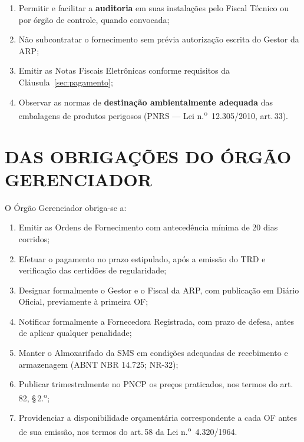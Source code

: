 \documentclass[12pt,a4paper]{article}
\newcommand{\art}[1]{art.\,#1}
\begin{document}
\begin{enumerate}
  \item Permitir e facilitar a \textbf{auditoria} em suas instalações pelo
    Fiscal Técnico ou por órgão de controle, quando convocada;

  \item Não subcontratar o fornecimento sem prévia autorização escrita do
    Gestor da ARP;

  \item Emitir as Notas Fiscais Eletrônicas conforme requisitos da
    Cláusula~\ref{sec:pagamento};

  \item Observar as normas de \textbf{destinação ambientalmente adequada}
    das embalagens de produtos perigosos (PNRS --- Lei
    n.\textsuperscript{o}~12.305/2010, \art{33}).
\end{enumerate}

\section{DAS OBRIGAÇÕES DO ÓRGÃO GERENCIADOR}

O Órgão Gerenciador obriga-se a:

\begin{enumerate}
  \item Emitir as Ordens de Fornecimento com antecedência mínima de 20 dias
    corridos;

  \item Efetuar o pagamento no prazo estipulado, após a emissão do TRD e
    verificação das certidões de regularidade;

  \item Designar formalmente o Gestor e o Fiscal da ARP, com publicação em
    Diário Oficial, previamente à primeira OF;

  \item Notificar formalmente a Fornecedora Registrada, com prazo de defesa,
    antes de aplicar qualquer penalidade;

  \item Manter o Almoxarifado da SMS em condições adequadas de recebimento e
    armazenagem (ABNT NBR 14.725; NR-32);

  \item Publicar trimestralmente no PNCP os preços praticados, nos termos do
    \art{82}, \S\,2.\textsuperscript{o};

  \item Providenciar a disponibilidade orçamentária correspondente a cada OF
    antes de sua emissão, nos termos do \art{58} da Lei
    n.\textsuperscript{o}~4.320/1964.
\end{enumerate}
\end{document}
